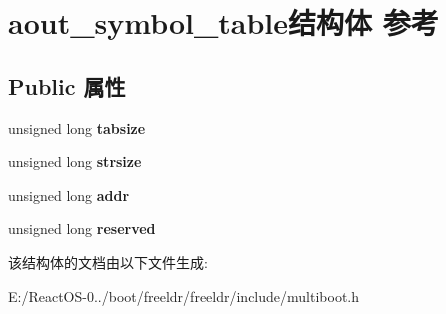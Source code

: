 \hypertarget{structaout__symbol__table}{}\section{aout\+\_\+symbol\+\_\+table结构体 参考}
\label{structaout__symbol__table}
\subsection*{Public 属性}
\begin{DoxyCompactItemize}
\item 
\mbox{\label{structaout__symbol__table_ac3c6d6aa9cdf59ae4ef83d2aaa679394}} 
unsigned long {\bfseries tabsize}
\item 
\mbox{\label{structaout__symbol__table_a62501946eea0a9aa53864aec0fbf8c16}} 
unsigned long {\bfseries strsize}
\item 
\mbox{\label{structaout__symbol__table_a0bc70ec3d3eb386fb68d3eaec4e96e9d}} 
unsigned long {\bfseries addr}
\item 
\mbox{\label{structaout__symbol__table_a73a9a85832f1259e78ead3e0d61628b0}} 
unsigned long {\bfseries reserved}
\end{DoxyCompactItemize}


该结构体的文档由以下文件生成\+:\begin{DoxyCompactItemize}
\item 
E\+:/\+React\+O\+S-\/0../boot/freeldr/freeldr/include/multiboot.\+h\end{DoxyCompactItemize}
